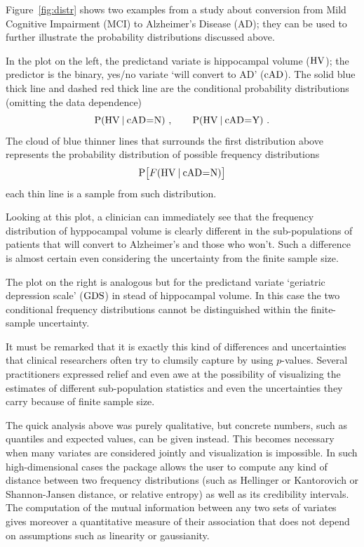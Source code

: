 Figure~\ref{fig:distr} shows two examples from a study \citep{portamanaetal2023b} about conversion from Mild Cognitive Impairment (MCI) to Alzheimer's Disease (AD); they can be used to further illustrate the probability distributions discussed above.

In the plot on the left, the predictand variate is hippocampal volume ($\mathrm{HV}$); the predictor is the binary, yes/no variate `will convert to AD' ($\mathrm{cAD}$). The solid blue thick line and dashed red thick line are the conditional probability distributions (omitting the data dependence)
\begin{equation*}
  \P( \HV \| \cAD \mo \yn)\ ,\qquad
  \P( \HV \| \cAD \mo \yy) \ .
\end{equation*}
The cloud of blue thinner lines that surrounds the first distribution above  represents the probability distribution of possible frequency distributions
\begin{equation*}
  \P\bigl[ \yF(\HV \| \cAD \mo \yn)\bigr]
\end{equation*}
each thin line is a sample from such distribution.

Looking at this plot, a clinician can immediately see that the frequency distribution of hyppocampal volume is clearly different in the sub-populations of patients that will convert to Alzheimer's and those who won't. Such a difference is almost certain even considering the uncertainty from the finite sample size.

The plot on the right is analogous but for the predictand variate `geriatric depression scale' ($\mathrm{GDS}$) in stead of hippocampal volume. In this case the two conditional frequency distributions cannot be distinguished within the finite-sample uncertainty.

It must be remarked that it is exactly this kind of differences and uncertainties that clinical researchers often try to clumsily capture by using $p$-values. Several practitioners expressed relief and even awe at the possibility of visualizing the estimates of different sub-population statistics and even the uncertainties they carry because of finite sample size.

The quick analysis above was purely qualitative, but concrete numbers, such as quantiles and expected values, can be given instead. This becomes necessary when many variates are considered jointly and visualization is impossible. In such high-dimensional cases the package allows the user to compute any kind of distance between two frequency distributions (such as Hellinger or Kantorovich or Shannon-Jansen distance, or relative entropy) as well as its credibility intervals. The computation of the mutual information between any two sets of variates gives moreover a quantitative measure of their association that does not depend on assumptions such as linearity or gaussianity.

